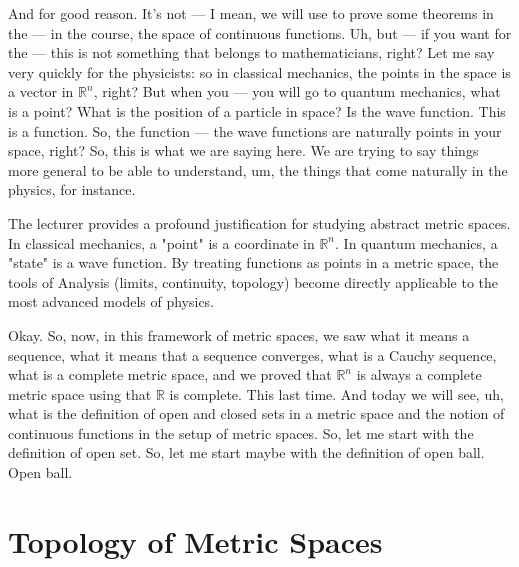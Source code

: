 \begin{spoken-clean}[00:01:51 - 00:02:22]
And for good reason. It's not --- I mean, we will use to prove some theorems in the --- in the course, the space of continuous functions. Uh, but --- if you want for the --- this is not something that belongs to mathematicians, right? Let me say very quickly for the physicists: so in classical mechanics, the points in the space is a vector in $\mathbb{R}^n$, right? But when you --- you will go to quantum mechanics, what is a point? What is the position of a particle in space? Is the wave function. This is a function. So, the function --- the wave functions are naturally points in your space, right? So, this is what we are saying here. We are trying to say things more general to be able to understand, um, the things that come naturally in the physics, for instance.
\end{spoken-clean}

\begin{didactic-insight}
The lecturer provides a profound justification for studying abstract metric spaces. In classical mechanics, a "point" is a coordinate in $\mathbb{R}^n$. In quantum mechanics, a "state" is a wave function. By treating functions as points in a metric space, the tools of Analysis (limits, continuity, topology) become directly applicable to the most advanced models of physics.
\end{didactic-insight}

\begin{spoken-clean}[00:02:22 - 00:03:13]
Okay. So, now, in this framework of metric spaces, we saw what it means a sequence, what it means that a sequence converges, what is a Cauchy sequence, what is a complete metric space, and we proved that $\mathbb{R}^n$ is always a complete metric space using that $\mathbb{R}$ is complete. This last time. And today we will see, uh, what is the definition of open and closed sets in a metric space and the notion of continuous functions in the setup of metric spaces. So, let me start with the definition of open set. So, let me start maybe with the definition of open ball. Open ball.
\end{spoken-clean}

\setcounter{section}{1}
\section{Topology of Metric Spaces}
